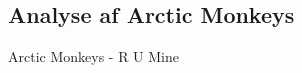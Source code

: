 \documentclass[12pt, letterpaper]{article}
\begin{document}
\begin{figure}[!h]
           \begin{floatrow}
       
           \end{floatrow}
\end{figure}


\newpage



\subsection{Analyse af Arctic Monkeys}
Arctic Monkeys - R U Mine
\end{document}
